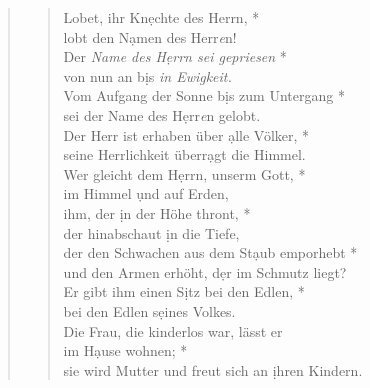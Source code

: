 
\begin{quote}

\begin{verse}
Lobet, ihr Kn\d echte des Herrn, *\\
lobt den N\d amen des Herr\textit{e}n!\\ 
\vin Der \textit{ Name des H\d errn sei gepriesen} *\\ 
\vin von nun an b\d is \textit{in Ewigkeit.}\\
Vom Aufgang der Sonne b\d is zum Untergang *\\
sei der Name des H\d err{\textit{e}}n gelobt.\\ 
\vin Der Herr ist erhaben über \d alle Völker, *\\ 
\vin seine Herrlichkeit überr\d agt die Himmel.\\ 
Wer gleicht dem H\d errn, unserm Gott, *\\
im Himmel \d und auf Erden,\\ 
\vin ihm, der \d in der Höhe thront, *\\ 
\vin der hinabschaut \d in die Tiefe, \\
der den Schwachen aus dem St\d aub emporhebt *\\
und den Armen erhöht, d\d er im Schmutz liegt?\\ 
\vin Er gibt ihm einen S\d itz bei den Edlen, *\\ 
\vin bei den Edlen s\d eines Volkes.\\ 
Die Frau, die kinderlos war, lässt er\\
im H\d ause wohnen; *\\
sie wird Mutter und freut sich an \d ihren Kindern.\\ 

\end{verse}
\end{quote}

\vspace{0.3cm}


\def\greinitialformat#1{{\fontsize{40}{40}\selectfont #1}}
\gresetfirstlineaboveinitial{\small \textcolor{red}{Ps 114}}{}
\setaboveinitialseparation{0.72mm}

\vspace{0.3cm}



